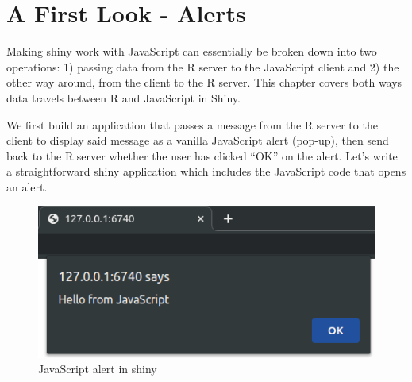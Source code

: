 \documentclass[
]{krantz}
\makeatletter
\newenvironment{Shaded}{\begin{snugshade}}{\end{snugshade}}
\newcommand{\ControlFlowTok}[1]{\textcolor[rgb]{0.27,0.27,0.27}{\textbf{#1}}}
\newcommand{\KeywordTok}[1]{\textcolor[rgb]{0.27,0.27,0.27}{\textbf{#1}}}
\newcommand{\NormalTok}[1]{#1}
\newcommand{\OperatorTok}[1]{\textcolor[rgb]{0.43,0.43,0.43}{\textbf{#1}}}
\newcommand{\StringTok}[1]{\textcolor[rgb]{0.5,0.5,0.5}{#1}}
\newenvironment{kframe}{%
\medskip{}
\setlength{\fboxsep}{.8em}
 \def\at@end@of@kframe{}%
 \ifinner\ifhmode%
  \def\at@end@of@kframe{\end{minipage}}%
  \begin{minipage}{\columnwidth}%
 \fi\fi%
 \def\FrameCommand##1{\hskip\@totalleftmargin \hskip-\fboxsep
 \colorbox{shadecolor}{##1}\hskip-\fboxsep
     \hskip-\linewidth \hskip-\@totalleftmargin \hskip\columnwidth}%
 \MakeFramed {\advance\hsize-\width
   \@totalleftmargin\z@ \linewidth\hsize
   \@setminipage}}%
 {\par\unskip\endMakeFramed%
 \at@end@of@kframe}
\renewenvironment{Shaded}{\begin{kframe}}{\end{kframe}}
\makeatother
\begin{document}
\hypertarget{a-first-look---alerts}{%
\chapter{A First Look - Alerts}\label{a-first-look---alerts}}

Making shiny work with JavaScript can essentially be broken down into two operations: 1) passing data from the R server to the JavaScript client and 2) the other way around, from the client to the R server. This chapter covers both ways data travels between R and JavaScript in Shiny.

We first build an application that passes a message from the R server to the client to display said message as a vanilla JavaScript alert (pop-up), then send back to the R server whether the user has clicked ``OK'' on the alert. Let's write a straightforward shiny application which includes the JavaScript code that opens an alert.

\begin{Shaded}
\end{Shaded}

\begin{figure}
\centering
\includegraphics{images/alert.png}
\caption{JavaScript alert in shiny}
\end{figure}
\end{document}
